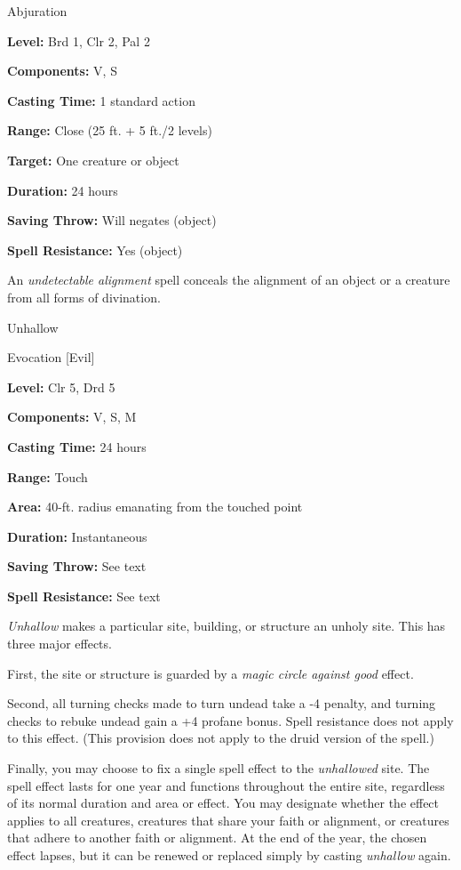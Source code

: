 \documentclass{article}
\begin{document}
Abjuration

\textbf{Level:} Brd 1, Clr 2, Pal 2

\textbf{Components:} V, S

\textbf{Casting Time:} 1 standard action

\textbf{Range:} Close (25 ft. + 5 ft./2 levels)

\textbf{Target:} One creature or object

\textbf{Duration:} 24 hours

\textbf{Saving Throw: }Will negates (object)

\textbf{Spell Resistance:} Yes (object)

An \textit{undetectable alignment }spell conceals the alignment of an object or 
a creature from all forms of divination.

\vspace{12pt}
Unhallow

Evocation [Evil]

\textbf{Level:} Clr 5, Drd 5

\textbf{Components:} V, S, M

\textbf{Casting Time:} 24 hours

\textbf{Range:} Touch

\textbf{Area:} 40-ft. radius emanating from the touched point

\textbf{Duration:} Instantaneous

\textbf{Saving Throw:} See text

\textbf{Spell Resistance:} See text

\textit{Unhallow }makes a particular site, building, or structure an unholy site. 
This has three major effects.

First, the site or structure is guarded by a \textit{magic circle against good 
}effect.

Second, all turning checks made to turn undead take a -4 penalty, and turning checks 
to rebuke undead gain a +4 profane bonus. Spell resistance does not apply to this 
effect. (This provision does not apply to the druid version of the spell.)

Finally, you may choose to fix a single spell effect to the \textit{unhallowed 
}site. The spell effect lasts for one year and functions throughout the entire 
site, regardless of its normal duration and area or effect. You may designate whether 
the effect applies to all creatures, creatures that share your faith or alignment, 
or creatures that adhere to another faith or alignment. At the end of the year, 
the chosen effect lapses, but it can be renewed or replaced simply by casting \textit{unhallow 
}again.
\end{document}
